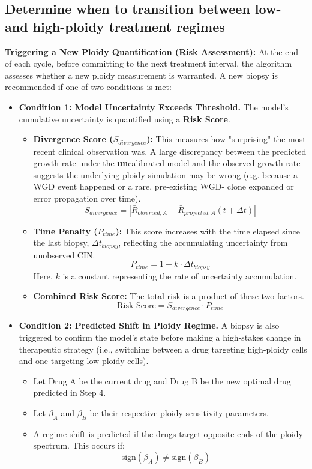 \documentclass{article}
\begin{document}
\subsection{Determine when to transition between low- and high-ploidy treatment regimes}


\textbf{Triggering a New Ploidy Quantification (Risk Assessment):}
    At the end of each cycle, before committing to the next treatment interval, the algorithm assesses whether a new ploidy measurement is warranted. A new biopsy is recommended if one of two conditions is met:
    \begin{itemize}
        \item \textbf{Condition 1: Model Uncertainty Exceeds Threshold.} The model's cumulative uncertainty is quantified using a \textbf{Risk Score}.
        \begin{itemize}
            \item \textbf{Divergence Score ($S_{divergence}$):} \color{blue} This measures how "surprising" the most recent clinical observation was. A large discrepancy between the predicted growth rate under the \textbf{un}calibrated model and the observed growth rate suggests the underlying ploidy simulation may be wrong (e.g. because a WGD event happened or a rare, pre-existing WGD- clone expanded or error propagation over time).
            $$ S_{divergence} = |\bar{R}_{observed, A} - \bar{R}_{projected, A}(t+\Delta t)| $$
            \color{black} 
            \item \textbf{Time Penalty ($P_{time}$):} This score increases with the time elapsed since the last biopsy, $\Delta t_{biopsy}$, reflecting the accumulating uncertainty from unobserved CIN.
            $$ P_{time} = 1 + k \cdot \Delta t_{biopsy} $$
            Here, $k$ is a constant representing the rate of uncertainty accumulation.
            \item \textbf{Combined Risk Score:} The total risk is a product of these two factors.
            $$ \text{Risk Score} = S_{divergence} \cdot P_{time} $$
        \end{itemize}

        \item \textbf{Condition 2: Predicted Shift in Ploidy Regime.} \color{blue} A biopsy is also triggered to confirm the model's state before making a high-stakes change in therapeutic strategy (i.e., switching between a drug targeting high-ploidy cells and one targeting low-ploidy cells). \color{black} 
        \begin{itemize}
            \item Let Drug A be the current drug and Drug B be the new optimal drug predicted in Step 4.
            \item Let $\beta_A$ and $\beta_B$ be their respective ploidy-sensitivity parameters.
            \item A regime shift is predicted if the drugs target opposite ends of the ploidy spectrum. This occurs if:
            $$ \text{sign}(\beta_A) \neq \text{sign}(\beta_B) \quad  $$
        \end{itemize}


\end{itemize}
\end{document}
